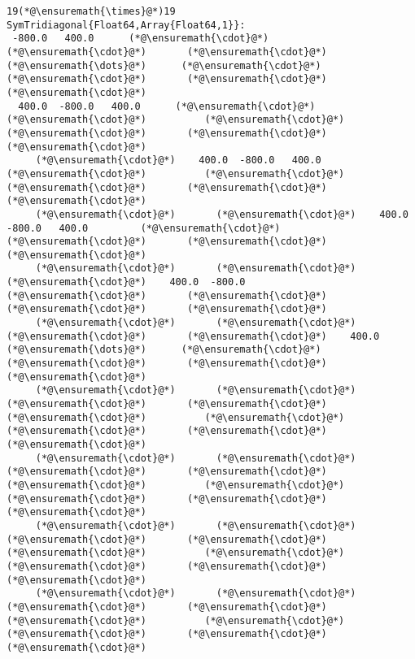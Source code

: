 \documentclass[12pt,a4paper]{article}
\begin{document}
\begin{lstlisting}
19(*@\ensuremath{\times}@*)19 SymTridiagonal{Float64,Array{Float64,1}}:
 -800.0   400.0      (*@\ensuremath{\cdot}@*)       (*@\ensuremath{\cdot}@*)       (*@\ensuremath{\cdot}@*)   (*@\ensuremath{\dots}@*)      (*@\ensuremath{\cdot}@*)       (*@\ensuremath{\cdot}@*)       (*@\ensuremath{\cdot}@*)       (*@\ensuremath{\cdot}@*) 
  400.0  -800.0   400.0      (*@\ensuremath{\cdot}@*)       (*@\ensuremath{\cdot}@*)          (*@\ensuremath{\cdot}@*)       (*@\ensuremath{\cdot}@*)       (*@\ensuremath{\cdot}@*)       (*@\ensuremath{\cdot}@*) 
     (*@\ensuremath{\cdot}@*)    400.0  -800.0   400.0      (*@\ensuremath{\cdot}@*)          (*@\ensuremath{\cdot}@*)       (*@\ensuremath{\cdot}@*)       (*@\ensuremath{\cdot}@*)       (*@\ensuremath{\cdot}@*) 
     (*@\ensuremath{\cdot}@*)       (*@\ensuremath{\cdot}@*)    400.0  -800.0   400.0         (*@\ensuremath{\cdot}@*)       (*@\ensuremath{\cdot}@*)       (*@\ensuremath{\cdot}@*)       (*@\ensuremath{\cdot}@*) 
     (*@\ensuremath{\cdot}@*)       (*@\ensuremath{\cdot}@*)       (*@\ensuremath{\cdot}@*)    400.0  -800.0         (*@\ensuremath{\cdot}@*)       (*@\ensuremath{\cdot}@*)       (*@\ensuremath{\cdot}@*)       (*@\ensuremath{\cdot}@*) 
     (*@\ensuremath{\cdot}@*)       (*@\ensuremath{\cdot}@*)       (*@\ensuremath{\cdot}@*)       (*@\ensuremath{\cdot}@*)    400.0  (*@\ensuremath{\dots}@*)      (*@\ensuremath{\cdot}@*)       (*@\ensuremath{\cdot}@*)       (*@\ensuremath{\cdot}@*)       (*@\ensuremath{\cdot}@*) 
     (*@\ensuremath{\cdot}@*)       (*@\ensuremath{\cdot}@*)       (*@\ensuremath{\cdot}@*)       (*@\ensuremath{\cdot}@*)       (*@\ensuremath{\cdot}@*)          (*@\ensuremath{\cdot}@*)       (*@\ensuremath{\cdot}@*)       (*@\ensuremath{\cdot}@*)       (*@\ensuremath{\cdot}@*) 
     (*@\ensuremath{\cdot}@*)       (*@\ensuremath{\cdot}@*)       (*@\ensuremath{\cdot}@*)       (*@\ensuremath{\cdot}@*)       (*@\ensuremath{\cdot}@*)          (*@\ensuremath{\cdot}@*)       (*@\ensuremath{\cdot}@*)       (*@\ensuremath{\cdot}@*)       (*@\ensuremath{\cdot}@*) 
     (*@\ensuremath{\cdot}@*)       (*@\ensuremath{\cdot}@*)       (*@\ensuremath{\cdot}@*)       (*@\ensuremath{\cdot}@*)       (*@\ensuremath{\cdot}@*)          (*@\ensuremath{\cdot}@*)       (*@\ensuremath{\cdot}@*)       (*@\ensuremath{\cdot}@*)       (*@\ensuremath{\cdot}@*) 
     (*@\ensuremath{\cdot}@*)       (*@\ensuremath{\cdot}@*)       (*@\ensuremath{\cdot}@*)       (*@\ensuremath{\cdot}@*)       (*@\ensuremath{\cdot}@*)          (*@\ensuremath{\cdot}@*)       (*@\ensuremath{\cdot}@*)       (*@\ensuremath{\cdot}@*)       (*@\ensuremath{\cdot}@*) 

\end{lstlisting}
\end{document}
